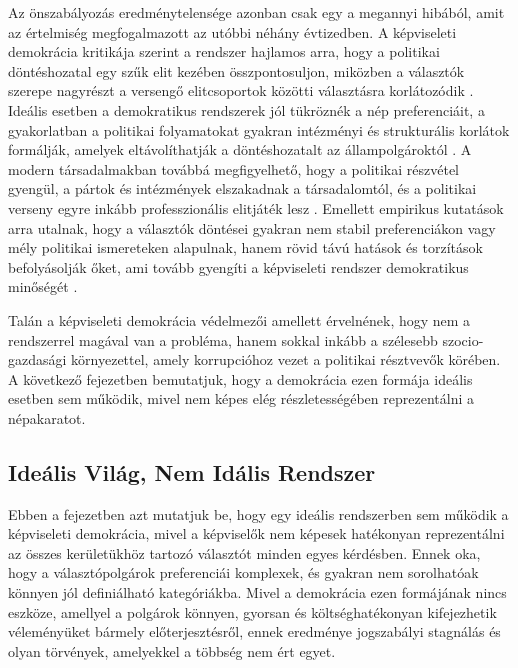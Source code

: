 Az önszabályozás eredménytelensége azonban csak egy a megannyi hibából, amit az
értelmiség megfogalmazott az utóbbi néhány évtizedben. A képviseleti demokrácia
kritikája szerint a rendszer hajlamos arra, hogy a politikai döntéshozatal egy szűk elit
kezében összpontosuljon, miközben a választók szerepe nagyrészt a versengő elitcsoportok
közötti választásra korlátozódik \cite{rep_dem_critic_1, rep_dem_critic_3}. Ideális
esetben a demokratikus rendszerek jól tükröznék a nép preferenciáit, a gyakorlatban a
politikai folyamatokat gyakran intézményi és strukturális korlátok formálják, amelyek
eltávolíthatják a döntéshozatalt az állampolgároktól \cite{rep_dem_critic_2}. A modern
társadalmakban továbbá megfigyelhető, hogy a politikai részvétel gyengül, a pártok és
intézmények elszakadnak a társadalomtól, és a politikai verseny egyre inkább professzionális
elitjáték lesz \cite{rep_dem_critic_4, rep_dem_critic_5}. Emellett empirikus kutatások arra
utalnak, hogy a választók döntései gyakran nem stabil preferenciákon vagy mély politikai
ismereteken alapulnak, hanem rövid távú hatások és torzítások befolyásolják őket,
ami tovább gyengíti a képviseleti rendszer demokratikus minőségét \cite{rep_dem_critic_6}.

Talán a képviseleti demokrácia védelmezői amellett érvelnének, hogy nem a rendszerrel
magával van a probléma, hanem sokkal inkább a szélesebb szocio-gazdasági környezettel,
amely korrupcióhoz vezet a politikai résztvevők körében. A következő fejezetben
bemutatjuk, hogy a demokrácia ezen formája ideális esetben sem működik, mivel nem képes
elég részletességében reprezentálni a népakaratot.


\subsection{Ideális Világ, Nem Idális Rendszer}

Ebben a fejezetben azt mutatjuk be, hogy egy ideális rendszerben sem működik a
képviseleti demokrácia, mivel a képviselők nem képesek hatékonyan reprezentálni
az összes kerületükhöz tartozó választót minden egyes kérdésben. Ennek oka, hogy
a választópolgárok preferenciái komplexek, és gyakran nem sorolhatóak könnyen jól
definiálható kategóriákba. Mivel a demokrácia ezen formájának nincs eszköze, amellyel
a polgárok könnyen, gyorsan és költséghatékonyan kifejezhetik véleményüket bármely
előterjesztésről, ennek eredménye jogszabályi stagnálás és olyan törvények, amelyekkel
a többség nem ért egyet.

